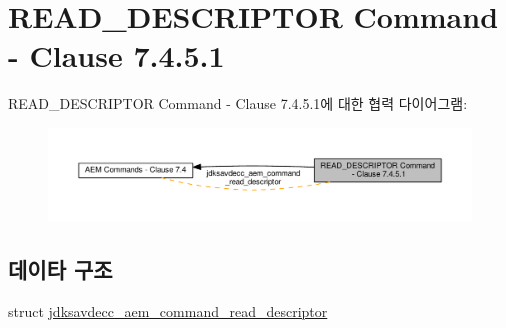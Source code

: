 \hypertarget{group__command__read__descriptor}{}\section{R\+E\+A\+D\+\_\+\+D\+E\+S\+C\+R\+I\+P\+T\+OR Command -\/ Clause 7.4.5.1}
\label{group__command__read__descriptor}
R\+E\+A\+D\+\_\+\+D\+E\+S\+C\+R\+I\+P\+T\+OR Command -\/ Clause 7.4.5.1에 대한 협력 다이어그램\+:
\nopagebreak
\begin{figure}[H]
\begin{center}
\leavevmode
\includegraphics[width=350pt]{group__command__read__descriptor}
\end{center}
\end{figure}
\subsection*{데이타 구조}
\begin{DoxyCompactItemize}
\item 
struct \hyperlink{structjdksavdecc__aem__command__read__descriptor}{jdksavdecc\+\_\+aem\+\_\+command\+\_\+read\+\_\+descriptor}
\end{DoxyCompactItemize}
